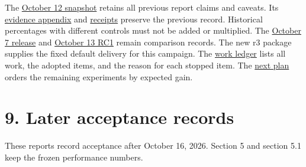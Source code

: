 \documentclass[10pt,a4paper]{article}
\begin{document}
The
\href{https://github.com/MoyaMryia/riscv-accl/blob/main/spacemit/reports/snapshots/2026-10-12/SUBMISSION-REPORT.pdf}{October
12 snapshot} retains all previous report claims and caveats. Its
\href{https://github.com/MoyaMryia/riscv-accl/blob/main/spacemit/reports/snapshots/2026-10-12/SUBMISSION-EVIDENCE.md}{evidence
appendix} and
\href{https://github.com/MoyaMryia/riscv-accl/blob/main/spacemit/reports/snapshots/2026-10-12/receipts.json}{receipts}
preserve the previous record. Historical percentages with different
controls must not be added or multiplied. The
\href{https://github.com/MoyaMryia/riscv-accl/blob/main/spacemit/reports/2026-10-07-release-verification.md}{October
7 release} and
\href{https://github.com/MoyaMryia/riscv-accl/blob/main/spacemit/reports/2026-10-13-unified-release-candidate.md}{October
13 RC1} remain comparison records. The new r3 package supplies the fixed
default delivery for this campaign. The
\href{https://github.com/MoyaMryia/riscv-accl/blob/main/spacemit/reports/WORK-LEDGER.md}{work
ledger} lists all work, the adopted items, and the reason for each
stopped item. The
\href{https://github.com/MoyaMryia/riscv-accl/blob/main/spacemit/reports/2026-10-16-next-plan.md}{next
plan} orders the remaining experiments by expected gain.

\hypertarget{later-acceptance-records}{%
\section{9. Later acceptance records}\label{later-acceptance-records}}

These reports record acceptance after October 16, 2026. Section 5 and
section 5.1 keep the frozen performance numbers.
\end{document}
